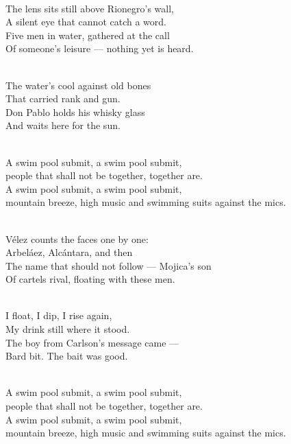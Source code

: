 \begin{lyrics}
\\
The lens sits still above Rionegro's wall,\\
A silent eye that cannot catch a word.\\
Five men in water, gathered at the call\\
Of someone's leisure — nothing yet is heard.

\\
The water's cool against old bones\\
That carried rank and gun.\\
Don Pablo holds his whisky glass\\
And waits here for the sun.

\\
A swim pool submit, a swim pool submit,\\
people that shall not be together, together are.\\
A swim pool submit, a swim pool submit,\\
mountain breeze, high music and swimming suits against the mics.

\\
Vélez counts the faces one by one:\\
Arbeláez, Alcántara, and then\\
The name that should not follow — Mojica's son\\
Of cartels rival, floating with these men.

\\
I float, I dip, I rise again,\\
My drink still where it stood.\\
The boy from Carlson's message came —\\
Bard bit. The bait was good.

\\
A swim pool submit, a swim pool submit,\\
people that shall not be together, together are.\\
A swim pool submit, a swim pool submit,\\
mountain breeze, high music and swimming suits against the mics.


\end{lyrics}
